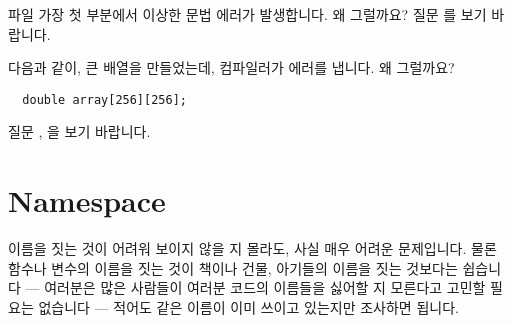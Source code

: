 \begin{faq}
        파일 가장 첫 부분에서 이상한 문법 에러가 발생합니다. 왜 그럴까요?
\A
        질문 를 보기 바랍니다.
\end{faq}

\begin{faq}
        다음과 같이, 큰 배열을 만들었는데, 컴파일러가 에러를 냅니다.
        왜 그럴까요?
\begin{verbatim}
  double array[256][256];
\end{verbatim}
\A
        질문 , 을 보기 바랍니다.
\end{faq}

\section{Namespace}	\label{sec:namespace}
이름을 짓는 것이 어려워 보이지 않을 지 몰라도, 사실 매우 어려운 문제입니다.
물론 함수나 변수의 이름을 짓는 것이 책이나 건물, 아기들의 이름을 짓는 것보다는
쉽습니다 --- 여러분은 많은 사람들이 여러분 코드의 이름들을 싫어할 지 모른다고
고민할 필요는 없습니다 --- 적어도 같은 이름이 이미 쓰이고 있는지만
조사하면 됩니다.

